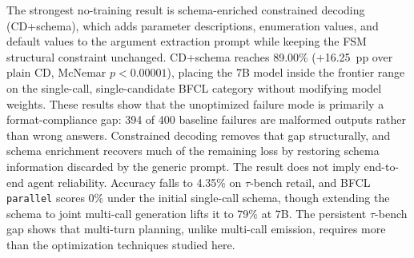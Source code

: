 The strongest no-training result is schema-enriched constrained decoding
(CD+schema), which adds parameter descriptions, enumeration values, and default
values to the argument extraction prompt while keeping the FSM structural
constraint unchanged. CD+schema reaches 89.00\% ($+$16.25~pp over plain CD,
McNemar $p < 0.00001$), placing the 7B model inside the frontier range on the
single-call, single-candidate BFCL category without modifying model weights.
These results show that the unoptimized failure mode is primarily a
format-compliance gap: 394 of 400 baseline failures are malformed outputs rather
than wrong answers. Constrained decoding removes that gap structurally, and
schema enrichment recovers much of the remaining loss by restoring schema
information discarded by the generic prompt. The result does not imply
end-to-end agent reliability. Accuracy falls to 4.35\% on $\tau$-bench retail,
and BFCL \texttt{parallel} scores 0\% under the initial single-call schema,
though extending the schema to joint multi-call generation lifts it to 79\% at
7B. The persistent $\tau$-bench gap shows that multi-turn planning, unlike
multi-call emission, requires more than the optimization techniques studied
here.
